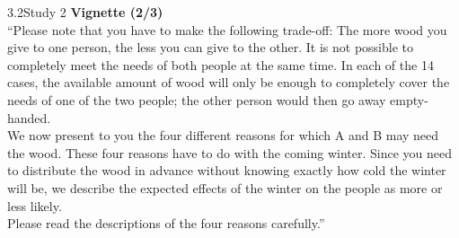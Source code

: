\documentclass[xcolor=table,9pt,aspectratio=169]{beamer}
\begin{document}
\begin{frame}{\vspace*{10mm}3.2\hspace*{1em}Study 2}
\textbf{Vignette (2/3)}\\
\medskip
\enquote{Please note that you have to make the following trade-off:
The more wood you give to one person, the less you can give to the other.
It is not possible to completely meet the needs of both people at the same time.
In each of the 14 cases, the available amount of wood will only be enough to completely cover the needs of one of the two people; the other person would then go away empty-handed.\\
\medskip
We now present to you the four different reasons for which A and B may need the wood.
These four reasons have to do with the coming winter.
Since you need to distribute the wood in advance without knowing exactly how cold the winter will be, we describe the expected effects of the winter on the people as more or less likely.\\
\medskip
Please read the descriptions of the four reasons carefully.}
\end{frame}
\end{document}
